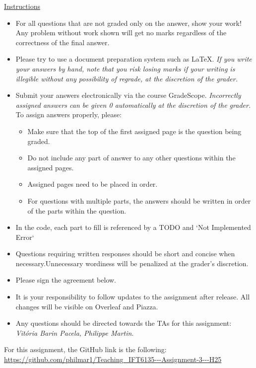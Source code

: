 \documentclass[12pt]{article}
\theoremstyle{definition}
\begin{document}
\vspace{-0.5cm}
\underline{Instructions}
\renewcommand{\labelitemi}{\textbullet}
\begin{itemize}
\item For all questions that are not graded only on the answer, show your work! Any problem without work shown will get no marks regardless of the correctness of the final answer.
\item Please try to use a document preparation system such as LaTeX. \emph{If  you write your answers by hand, note that you risk losing marks if your writing is illegible without any possibility of regrade, at the discretion of the grader.}
\item Submit your answers electronically via the course GradeScope. \emph{Incorrectly assigned answers can be given 0 automatically at the discretion of the grader.} To assign answers properly, please:
\begin{itemize}
    \item Make sure that the top of the first assigned page is the question being graded.
    \item Do not include any part of answer to any other questions within the assigned pages.
    \item Assigned pages need to be placed in order.
    \item For questions with multiple parts, the answers should be written in order of the parts within the question.
\end{itemize}
\item  In the code, each part to fill is referenced by a TODO and `Not Implemented Error`
\item Questions requiring written responses should be short and concise when necessary.Unnecessary wordiness will be penalized at the grader's discretion.
\item Please sign the agreement below.
\item It is your responsibility to follow updates to the assignment after release. All changes will be visible on Overleaf and Piazza.
\item Any questions should be directed towards the TAs for this assignment: \textit{Vitória Barin Pacela, Philippe Martin}.
\end{itemize}

 
For this assignment, the GitHub link is the following: \url{https://github.com/philmar1/Teaching_IFT6135---Assignment-3---H25}
\end{document}
